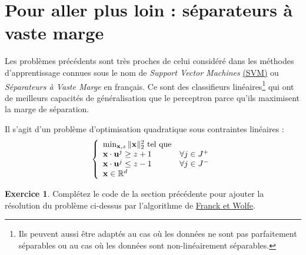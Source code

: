 \documentclass[a4paper,francais]{article}
\newcommand{\R}{{\ensuremath\mathbb{R}}}
\theoremstyle{definition}
\newtheorem{exercice}{Exercice}[section]
\begin{document}
\section{Pour aller plus loin : séparateurs à vaste marge}
\label{sec:svm}

Les problèmes précédents sont très proches de celui considéré dans les
méthodes d'apprentissage connues sous le nom de \emph{Support Vector Machines}
\href{https://en.wikipedia.org/wiki/Support-vector_machine}{(SVM)} ou
\emph{Séparateurs à Vaste Marge} en français. Ce sont des classifieurs
linéaires\footnote{Ils peuvent aussi être adaptés au cas où les données
  ne sont pas parfaitement séparables ou au cas où les données sont
  non-linéairement séparables.} 
qui ont de meilleurs capacités de généralisation que le perceptron 
parce qu'ils maximisent la marge de séparation.

Il s'agit d'un problème d'optimisation quadratique sous contraintes
linéaires : 
\[
\left\{
\begin{array}{ll}
  \min_{\vec{x},z} \|\vec{x}\|_2^2 \ \text{tel que} & \\
  \vec{x} \cdot \vec{u}^j \geq z + 1 & \forall j \in J^+ \\ 
  \vec{x} \cdot \vec{u}^j \leq z - 1 & \forall j \in J^- \\
  \vec{x} \in \R^d
\end{array}
\right.
\]

\begin{exercice}
  Complétez le code de la section précédente pour ajouter la résolution du problème
  ci-dessus par l'algorithme de
  \href{https://en.wikipedia.org/wiki/Frank%E2%80%93Wolfe_algorithm}{Franck et Wolfe}. 
\end{exercice}
\end{document}
